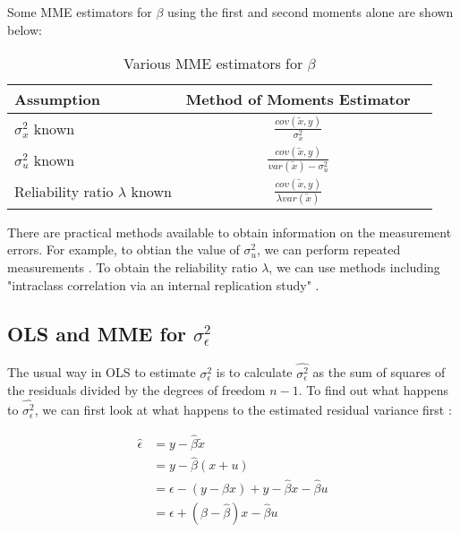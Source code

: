 \documentclass{article}
\begin{document}
Some MME estimators for $\beta$ using the first and second moments alone are shown below:

\begin{table}[ht]
    \centering
    \caption{Various MME estimators for $\beta$}
    \begin{tabular}[t]{lcc}
        \hline
        Assumption&Method of Moments Estimator\\
        \hline
        $\sigma^2_x$ known&$\frac{cov(\tilde{x}, y)}{\sigma^2_x}$\\
        $\sigma^2_u$ known&$\frac{cov(\tilde{x}, y)}{var(\tilde{x}) - \sigma^2_u}$\\
        Reliability ratio $\lambda$ known&$\frac{cov(\tilde{x}, y)}{\lambda var(\tilde{x})}$\\
        \hline
    \end{tabular}
\end{table}%

There are practical methods available to obtain information on the measurement errors. For example, to obtian the value of $\sigma^2_u$, we can perform repeated measurements \cite{mmereport}. To obtain the reliability ratio $\lambda$, we can use methods including "intraclass correlation via an internal replication study" \cite{mmereport}.

\subsection{OLS and MME for $\sigma_\epsilon^2$}

The usual way in OLS to estimate $\sigma_\epsilon^2$ is to calculate $\hat{\sigma^2_\epsilon}$ as the sum of squares of the residuals divided by the degrees of freedom $n-1$.
To find out what happens to $\hat{\sigma^2_\epsilon}$, we can first look at what happens to the estimated residual variance first \cite{lecturenotes}:

\begin{equation}
    \begin{split}
        \hat{\epsilon}  &= y - \hat{\beta} \tilde{x} \\
                        &= y - \hat{\beta}(x+u) \\
                        &= \epsilon - (y - \beta x) + y - \hat{\beta}x - \hat{\beta}u \\
                        &= \epsilon + (\beta - \hat{\beta})x - \hat{\beta}u
    \end{split} 
\end{equation}
\end{document}
